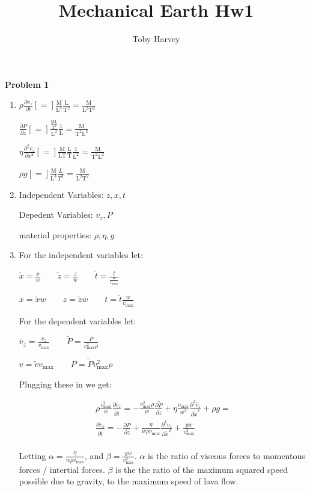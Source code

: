 \documentclass{article}
\begin{document}
\title{Mechanical Earth Hw1}
\author{Toby Harvey}
\maketitle
\noindent\textbf{Problem 1}

\begin{enumerate}
\item $\rho \frac{\partial v_z}{\partial t} [=] \frac{\text{M}}{\text{L}^3}\frac{\text{L}}{\text{T}^2} = \frac{\text{M}}{\text{L}^2\text{T}^2}$

  $\frac{\partial P}{\partial z} [=] \frac{\frac{\text{ML}}{\text{T}^2}}{\text{L}^2}\frac{1}{\text{L}} = \frac{\text{M}}{\text{T}^2\text{L}^2}$

  $\eta\frac{\partial^2v_z}{\partial x^2} [=] \frac{\text{M}}{\text{LT}}\frac{\text{L}}{\text{T}}\frac{1}{\text{L}^2} = \frac{\text{M}}{\text{T}^2\text{L}^2}$

  $\rho g [=] \frac{\text{M}}{\text{L}^3} \frac{L}{T^2} = \frac{\text{M}}{\text{L}^2\text{T}^2}$

\item Independent Variables: $z, x, t$

  Depedent Variables: $v_z, P$

  material properties: $\rho, \eta, g$

\item For the independent variables let:

  
  $\tilde{x} = \frac{x}{w} \qquad \tilde{z} = \frac{z}{w} \qquad \tilde{t} = \frac{t}{\frac{w}{v_{\text{max}}}}$

  $x = \tilde{x}w \qquad z = \tilde{z}w \qquad t = \tilde{t}\frac{w}{v_{\text{max}}}$

  For the dependent variables let:
  
  $ \tilde{v_z} = \frac{v_z}{v_{\text{max}}} \qquad \tilde{P} = \frac{P}{v_{\text{max}}^2\rho}$
 

  $v = \tilde{v}v_{\text{max}} \qquad P = \tilde{P} v_{\text{max}}^2 \rho$

  Plugging these in we get:

  \begin{gather*}
    \rho \frac{v_{\text{max}}^2}{w} \frac{\partial \tilde{v_z}}{\partial \tilde{t}} = -\frac{v_{\text{max}}^2\rho}{w} \frac{\partial \tilde{P}}{\partial \tilde{z}} + \eta \frac{v_{\text{max}}}{w^2} \frac{\partial^2 \tilde{v_z}}{\partial \tilde{x} ^2} + \rho g = \\
    \frac{\partial v_z}{\partial \tilde{t}} = - \frac{\partial P}{\partial \tilde{z}} + \frac{\eta}{w\rho v_{\text{max}}} \frac{\partial^2 v_z}{\partial \tilde{x} ^2} + \frac{gw}{v_{\text{max}}^2}\\
  \end{gather*}


  Letting $\alpha =  \frac{\eta}{w\rho v_{\text{max}}}$, and $\beta =  \frac{gw}{v_{\text{max}}^2}$. $\alpha$ is the ratio of viscous forces to momentous forces / intertial forces. $\beta$ is the the ratio of the maximum squared speed possible due to gravity, to the maximum speed of lava flow.
\end{enumerate}
\end{document}
